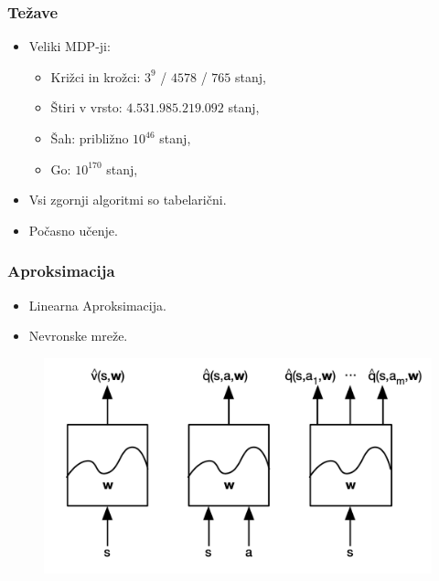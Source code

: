 \documentclass{beamer}    %
\begin{document}
\begin{frame}
    \frametitle{Težave}
    \begin{itemize}
        \item Veliki MDP-ji:
                \begin{itemize}
                    \item Križci in krožci: $3^9$ / $4578$ / $765$ stanj, 
                    \item Štiri v vrsto: $4.531.985.219.092$ stanj,
                    \item Šah: približno $10^{46}$ stanj, 
                    \item Go: $10^{170}$ stanj, 
                \end{itemize}
        \item Vsi zgornji algoritmi so tabelarični.
        \item Počasno učenje.
    \end{itemize}
\end{frame}


\begin{frame}
    \frametitle{Aproksimacija}
    \begin{itemize}
        \item Linearna Aproksimacija.
        \item Nevronske mreže.
    \end{itemize}
    \begin{figure}
        \includegraphics[scale=0.5]{slike/aproksimacija.png}
    \end{figure}
\end{frame}
\end{document}

